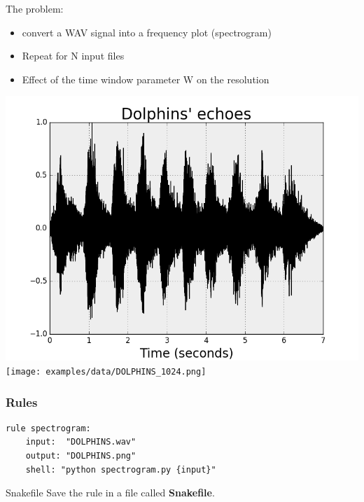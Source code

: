 \documentclass{beamer}
\begin{document}
\begin{frame}
\centering
The problem: 

\begin{itemize}
 \item convert a WAV signal into a frequency plot (spectrogram)
 \item Repeat for N input files
 \item Effect of the time window parameter W on the resolution
\end{itemize}
 \includegraphics[scale=0.28]{images/dolphin_timeseries.png} 
 \texttt{[image: examples/data/DOLPHINS\_1024.png]}
\end{frame}








\begin{frame}[fragile]
\frametitle{Rules}
\begin{center}

      \begin{minipage}{11cm}
        \begin{block}{}
            \begin{lstlisting}[basicstyle=\large]
rule spectrogram:
    input:  "DOLPHINS.wav"
    output: "DOLPHINS.png"
    shell: "python spectrogram.py {input}"
        \end{lstlisting}
         \end{block}        
        \begin{block}{Snakefile}
      Save the rule in a file called \textbf{Snakefile}. 
      \end{block}
    \end{minipage}
 \end{center}
\end{frame}
\end{document}
